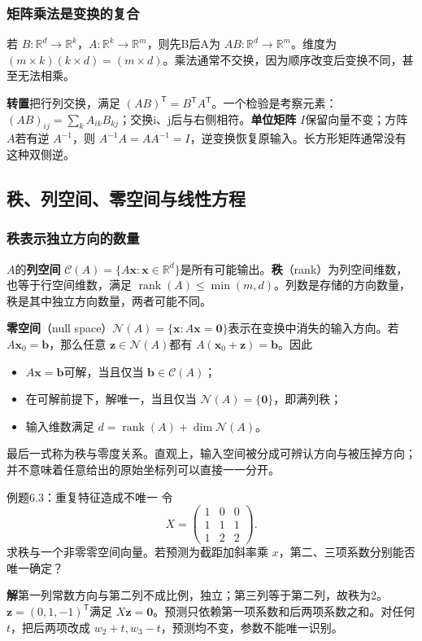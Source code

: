 \documentclass[UTF8,fontset=none,zihao=-4,a4paper]{ctexart}
\newcommand{\term}[1]{\textbf{#1}}
\newcommand{\sol}{\par\noindent\textbf{解}\quad}
\numberwithin{equation}{section}
\numberwithin{figure}{section}
\begin{document}
\subsubsection{矩阵乘法是变换的复合}
若 $B:\mathbb R^d\to\mathbb R^k$，$A:\mathbb R^k\to\mathbb R^m$，则先B后A为 $AB:\mathbb R^d\to\mathbb R^m$。维度为 $(m\times k)(k\times d)=(m\times d)$。乘法通常不交换，因为顺序改变后变换不同，甚至无法相乘。

\term{转置}把行列交换，满足 $(AB)^{\mathsf T}=B^{\mathsf T}A^{\mathsf T}$。一个检验是考察元素：$(AB)_{ij}=\sum_kA_{ik}B_{kj}$；交换i、j后与右侧相符。\term{单位矩阵} $I$保留向量不变；方阵 $A$若有逆 $A^{-1}$，则 $A^{-1}A=AA^{-1}=I$，逆变换恢复原输入。长方形矩阵通常没有这种双侧逆。

\subsection{秩、列空间、零空间与线性方程}
\subsubsection{秩表示独立方向的数量}
$A$的\term{列空间} $\mathcal C(A)=\{A\symbf x:\symbf x\in\mathbb R^d\}$是所有可能输出。\term{秩}（rank）为列空间维数，也等于行空间维数，满足 $\operatorname{rank}(A)\le\min(m,d)$。列数是存储的方向数量，秩是其中独立方向数量，两者可能不同。

\term{零空间}（null space）$\mathcal N(A)=\{\symbf x:A\symbf x=\symbf0\}$表示在变换中消失的输入方向。若 $A\symbf x_0=\symbf b$，那么任意 $\symbf z\in\mathcal N(A)$都有 $A(\symbf x_0+\symbf z)=\symbf b$。因此
\begin{itemize}
\item $A\symbf x=\symbf b$可解，当且仅当 $\symbf b\in\mathcal C(A)$；
\item 在可解前提下，解唯一，当且仅当 $\mathcal N(A)=\{\symbf0\}$，即满列秩；
\item 输入维数满足 $d=\operatorname{rank}(A)+\dim\mathcal N(A)$。
\end{itemize}
最后一式称为秩与零度关系。直观上，输入空间被分成可辨认方向与被压掉方向；并不意味着任意给出的原始坐标列可以直接一一分开。

\begin{infobox}{例题6.3：重复特征造成不唯一}
令
\[
 X=\begin{pmatrix}1&0&0\\1&1&1\\1&2&2\end{pmatrix}.
\]
求秩与一个非零零空间向量。若预测为截距加斜率乘 $x$，第二、三项系数分别能否唯一确定？
\end{infobox}
\sol 第一列常数方向与第二列不成比例，独立；第三列等于第二列，故秩为2。$\symbf z=(0,1,-1)^{\mathsf T}$满足 $X\symbf z=\symbf0$。预测只依赖第一项系数和后两项系数之和。对任何 $t$，把后两项改成 $w_2+t,w_3-t$，预测均不变，参数不能唯一识别。
\end{document}
